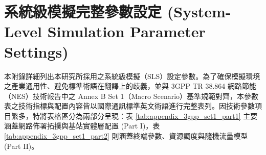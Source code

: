 
\appendix
\chapter{系統級模擬完整參數設定 (System-Level Simulation Parameter Settings)}
\label{appendix:A}

本附錄詳細列出本研究所採用之系統級模擬（SLS）設定參數。為了確保模擬環境之產業通用性、避免標準術語在翻譯上的歧義，並與 3GPP TR 38.864 網路節能（NES）技術報告中之 Annex B Set 1（Macro Scenario）基準規範對齊，本參數表之技術指標與配置內容皆以國際通訊標準英文術語進行完整表列。因技術參數項目繁多，特將表格區分為兩部分呈現：表 \ref{tab:appendix_3gpp_set1_part1} 主要涵蓋網路佈署拓撲與基站實體層配置 (Part I)，表 \ref{tab:appendix_3gpp_set1_part2} 則涵蓋終端參數、資源調度與隨機流量模型 (Part II)。

